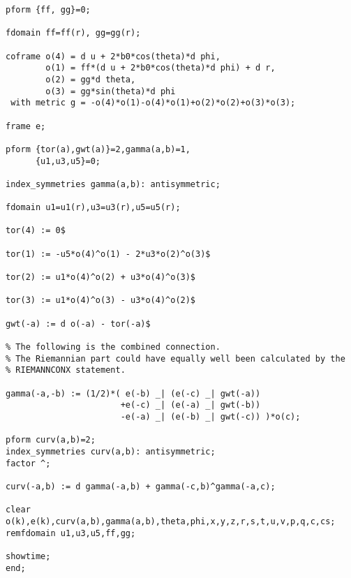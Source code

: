 {\begin{verbatim}
pform {ff, gg}=0;

fdomain ff=ff(r), gg=gg(r);

coframe o(4) = d u + 2*b0*cos(theta)*d phi,
        o(1) = ff*(d u + 2*b0*cos(theta)*d phi) + d r,
        o(2) = gg*d theta,
        o(3) = gg*sin(theta)*d phi
 with metric g = -o(4)*o(1)-o(4)*o(1)+o(2)*o(2)+o(3)*o(3);

frame e;

pform {tor(a),gwt(a)}=2,gamma(a,b)=1,
      {u1,u3,u5}=0;

index_symmetries gamma(a,b): antisymmetric;

fdomain u1=u1(r),u3=u3(r),u5=u5(r);

tor(4) := 0$

tor(1) := -u5*o(4)^o(1) - 2*u3*o(2)^o(3)$

tor(2) := u1*o(4)^o(2) + u3*o(4)^o(3)$

tor(3) := u1*o(4)^o(3) - u3*o(4)^o(2)$

gwt(-a) := d o(-a) - tor(-a)$

% The following is the combined connection.
% The Riemannian part could have equally well been calculated by the
% RIEMANNCONX statement.

gamma(-a,-b) := (1/2)*( e(-b) _| (e(-c) _| gwt(-a))
                       +e(-c) _| (e(-a) _| gwt(-b))
                       -e(-a) _| (e(-b) _| gwt(-c)) )*o(c);

pform curv(a,b)=2;
index_symmetries curv(a,b): antisymmetric;
factor ^;

curv(-a,b) := d gamma(-a,b) + gamma(-c,b)^gamma(-a,c);

clear o(k),e(k),curv(a,b),gamma(a,b),theta,phi,x,y,z,r,s,t,u,v,p,q,c,cs;
remfdomain u1,u3,u5,ff,gg;

showtime;
end;

\end{verbatim}
}

